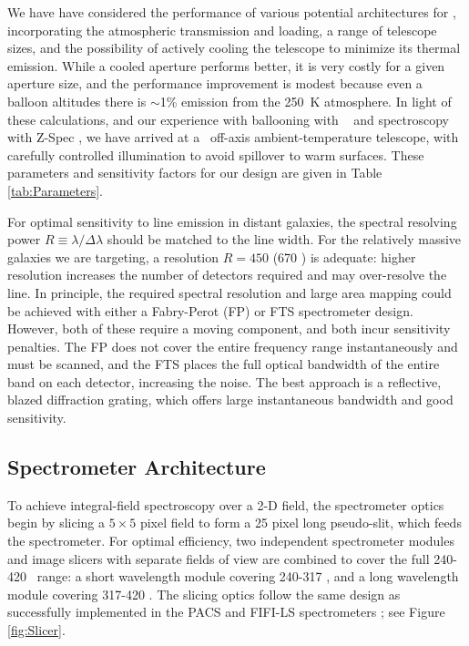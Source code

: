 We have have considered the performance of various potential
architectures for \name, incorporating the atmospheric transmission
and loading, a range of telescope sizes, and the possibility of
actively cooling the telescope to minimize its thermal emission.
While a cooled aperture performs better, it is very costly for a given
aperture size, and the performance improvement is modest because even
a balloon altitudes there is $\sim$1\% emission from the 250~K
atmosphere.  In light of these calculations, and our experience with
ballooning with \blast\  and spectroscopy
with Z-Spec , we
have arrived at a \D\ off-axis ambient-temperature telescope, with
carefully controlled illumination to avoid spillover to warm surfaces.
These parameters and sensitivity factors for our design are given in
Table \ref{tab:Parameters}.

For optimal sensitivity to line emission in distant galaxies, the
spectral resolving power $R \equiv \lambda/\Delta \lambda$ should be
matched to the line width. 
For the relatively massive galaxies we are targeting, a resolution $R = 450$ (670 \kms) is adequate: higher resolution increases the number of detectors required and may over-resolve the line.
In principle, the required spectral resolution and large area mapping
could be achieved with either a Fabry-Perot (FP) or FTS spectrometer
design. However, both of these require a moving component, and both
incur sensitivity penalties.
The FP does not cover the entire frequency range instantaneously and
must be scanned, and the FTS places the full optical bandwidth of the
entire band on each detector, increasing the noise. The best approach
is a reflective, blazed diffraction grating, which offers large
instantaneous bandwidth and good sensitivity.

\subsection{Spectrometer Architecture} 
\label{sec:Spectrometer} 

To achieve integral-field spectroscopy over a 2-D field, the spectrometer optics begin by slicing a $5\times5$ pixel field to form 
a 25 pixel long pseudo-slit, which feeds the spectrometer. 
For optimal efficiency, two independent spectrometer
modules and image slicers with separate fields of view are combined to
cover the full 240-420 \mum\ range: a short wavelength module covering
240-317 \mum, and a long wavelength module covering 317-420 \mum. The slicing
optics follow the same design as successfully implemented in the PACS and
FIFI-LS spectrometers \citep{looney03apj,looney03spie}; see Figure \ref{fig:Slicer}. 

